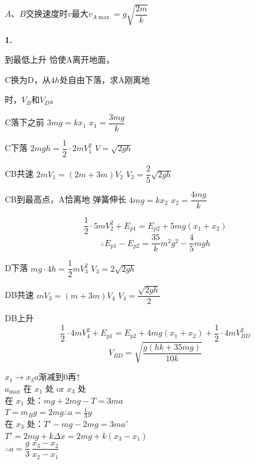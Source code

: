 $A$、$B$交换速度时$v$最大\quad $v_{A\max}=g\sqrt{\dfrac{2m}{k}}$

\textbf{1.}

\begin{problem}
到最低上升 恰使A离开地面，%

C换为D，从$4h$处自由下落，求A刚离地

时，$V_B$和$V_D$。
\begin{solution}
C落下之前 \quad $3mg=kx_1$ \quad $x_1=\dfrac{3mg}{k}$

C下落 \quad $2mgh=\dfrac12\cdot 2mV_1^{2}$ \quad $V=\sqrt{2gh}$ %

CB共速 \quad $2mV_1=(2m+3m)V_2$ \quad $V_2=\dfrac{2}{5}\sqrt{2gh}$

CB到最高点，A恰离地 弹簧伸长 \quad $4mg=kx_2$ \quad $x_2=\dfrac{4mg}{k}$

\[ \frac12\cdot 5mV_2^{2}+E_{p1}=E_{p2}+5mg(x_1+x_2) \]
\[ \therefore E_{p1}-E_{p2}=\frac{35}{k}m^{2}g^{2}-\frac{4}{5}mgh \]

D下落 \quad $mg\cdot 4h=\dfrac12 mV_3^{2}$ \quad $V_3=2\sqrt{2gh}$

DB共速 \quad $mV_3=(m+3m)V_4$ \quad $V_4=\dfrac{\sqrt{2gh}}{2}$

DB上升
\[ \frac12\cdot 4mV_4^{2}+E_{p1}=E_{p2}+4mg(x_1+x_2)+\frac12\cdot 4mV_{BD}^{2} \]
\[ V_{BD}=\sqrt{\frac{g(hk+35mg)}{10k}} \]
\end{solution}
\end{problem}



$x_1\to x_3$\quad $a$渐减到0再↑\\
$a_{\max}$ 在 $x_1$ 处 or $x_3$ 处\\
在 $x_1$ 处：$mg+2mg-T=3ma$\\
\hspace*{3em}$T=m_Bg=2mg$\quad $\therefore a=\frac13 g$\\
在 $x_3$ 处：$T'-mg-2mg=3ma'$\\
\hspace*{3em}$T'=2mg+k\Delta x=2mg+k(x_3-x_1)$\\
\hspace*{3em}$\therefore a=\dfrac{g}{3}\,\dfrac{x_3-x_2}{x_2-x_1}$ %


